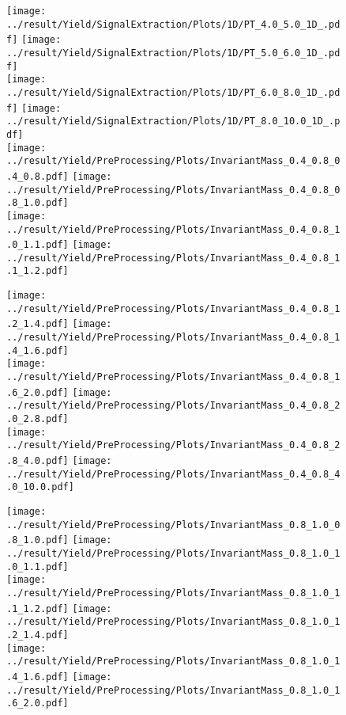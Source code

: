 \begin{figure}[!h]
	\centering
		\texttt{[image: ../result/Yield/SignalExtraction/Plots/1D/PT\_4.0\_5.0\_1D\_.pdf]}
		\texttt{[image: ../result/Yield/SignalExtraction/Plots/1D/PT\_5.0\_6.0\_1D\_.pdf]}\\
		\texttt{[image: ../result/Yield/SignalExtraction/Plots/1D/PT\_6.0\_8.0\_1D\_.pdf]}
		\texttt{[image: ../result/Yield/SignalExtraction/Plots/1D/PT\_8.0\_10.0\_1D\_.pdf]}\\
		\texttt{[image: ../result/Yield/PreProcessing/Plots/InvariantMass\_0.4\_0.8\_0.4\_0.8.pdf]}
		\texttt{[image: ../result/Yield/PreProcessing/Plots/InvariantMass\_0.4\_0.8\_0.8\_1.0.pdf]}\\
		\texttt{[image: ../result/Yield/PreProcessing/Plots/InvariantMass\_0.4\_0.8\_1.0\_1.1.pdf]}
		\texttt{[image: ../result/Yield/PreProcessing/Plots/InvariantMass\_0.4\_0.8\_1.1\_1.2.pdf]}
\end{figure}

\begin{figure}[!h]
	\centering
		\texttt{[image: ../result/Yield/PreProcessing/Plots/InvariantMass\_0.4\_0.8\_1.2\_1.4.pdf]}
		\texttt{[image: ../result/Yield/PreProcessing/Plots/InvariantMass\_0.4\_0.8\_1.4\_1.6.pdf]}\\
		\texttt{[image: ../result/Yield/PreProcessing/Plots/InvariantMass\_0.4\_0.8\_1.6\_2.0.pdf]}
		\texttt{[image: ../result/Yield/PreProcessing/Plots/InvariantMass\_0.4\_0.8\_2.0\_2.8.pdf]}\\
		\texttt{[image: ../result/Yield/PreProcessing/Plots/InvariantMass\_0.4\_0.8\_2.8\_4.0.pdf]}
		\texttt{[image: ../result/Yield/PreProcessing/Plots/InvariantMass\_0.4\_0.8\_4.0\_10.0.pdf]}
\end{figure}

\begin{figure}[!h]
	\centering
		\texttt{[image: ../result/Yield/PreProcessing/Plots/InvariantMass\_0.8\_1.0\_0.8\_1.0.pdf]}
		\texttt{[image: ../result/Yield/PreProcessing/Plots/InvariantMass\_0.8\_1.0\_1.0\_1.1.pdf]}\\
		\texttt{[image: ../result/Yield/PreProcessing/Plots/InvariantMass\_0.8\_1.0\_1.1\_1.2.pdf]}
		\texttt{[image: ../result/Yield/PreProcessing/Plots/InvariantMass\_0.8\_1.0\_1.2\_1.4.pdf]}\\
		\texttt{[image: ../result/Yield/PreProcessing/Plots/InvariantMass\_0.8\_1.0\_1.4\_1.6.pdf]}
		\texttt{[image: ../result/Yield/PreProcessing/Plots/InvariantMass\_0.8\_1.0\_1.6\_2.0.pdf]}
\end{figure}

